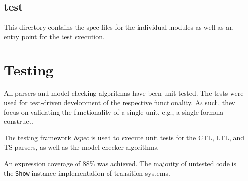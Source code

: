 \documentclass[11pt]{article}
\begin{document}
\subsection{test}

This directory contains the spec files for the individual modules as well as an entry point for the test execution.

\section{Testing}
\label{sec:testing}

All parsers and model checking algorithms have been unit tested.
The tests were used for test-driven development of the respective functionality.
As such, they focus on validating the functionality of a single unit, e.g., a single formula construct.

The testing framework \textit{hspec} is used to execute unit tests for the CTL, LTL, and TS parsers, as well as the model checker algorithms.

An expression coverage of 88\% was achieved.
The majority of untested code is the \verb|Show| instance implementation of transition systems. 
\end{document}
